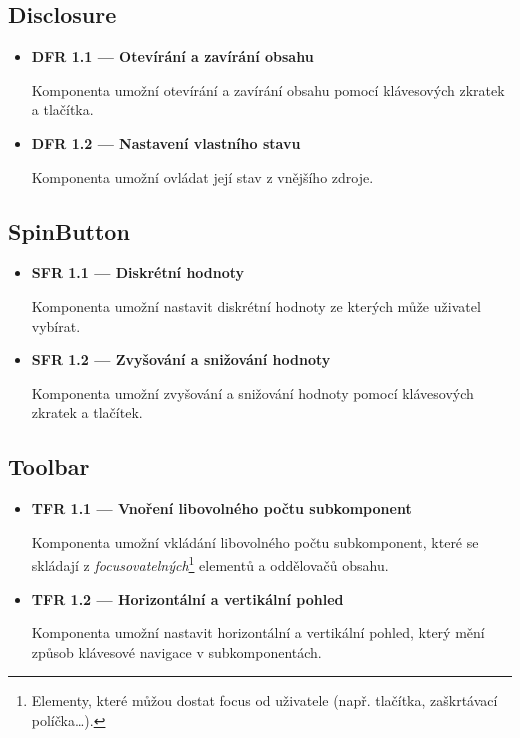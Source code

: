 \subsection{Disclosure}

\begin{itemize}
      \item \textbf{DFR 1.1 --- Otevírání a zavírání obsahu}\label{dfr11}

            Komponenta umožní otevírání a zavírání obsahu pomocí klávesových zkratek a tlačítka.

      \item \textbf{DFR 1.2 --- Nastavení vlastního stavu}\label{dfr12}

            Komponenta umožní ovládat její stav z vnějšího zdroje.
\end{itemize}

\subsection{SpinButton}

\begin{itemize}
      \item \textbf{SFR 1.1 --- Diskrétní hodnoty}\label{sfr11}

            Komponenta umožní nastavit diskrétní hodnoty ze kterých může uživatel vybírat.

      \item \textbf{SFR 1.2 --- Zvyšování a snižování hodnoty}\label{sfr12}

            Komponenta umožní zvyšování a snižování hodnoty pomocí klávesových zkratek a tlačítek.
\end{itemize}

\subsection{Toolbar}

\begin{itemize}
      \item \textbf{TFR 1.1 --- Vnoření libovolného počtu subkomponent}\label{tfr11}

            Komponenta umožní vkládání libovolného počtu subkomponent, které se skládají z \textit{focusovatelných}\footnote{Elementy, které můžou dostat focus od uživatele (např. tlačítka, zaškrtávací políčka\dots).} elementů a oddělovačů obsahu.

      \item \textbf{TFR 1.2 --- Horizontální a vertikální pohled}\label{tfr12}

            Komponenta umožní nastavit horizontální a vertikální pohled, který mění způsob klávesové navigace v subkomponentách.
\end{itemize}

